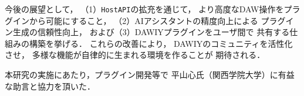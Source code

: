 今後の展望として，
（1）\texttt{HostAPI}の拡充を通じて，
より高度なDAW操作をプラグインから可能にすること，
（2）AIアシスタントの精度向上による
プラグイン生成の信頼性向上，
および（3）DAWIYプラグインをユーザ間で
共有する仕組みの構築を挙げる．
これらの改善により，
DAWIYのコミュニティを活性化させ，
多様な機能が自律的に生まれる環境を作ることが
期待される．

\begin{acknowledgment}
      本研究の実施にあたり，プラグイン開発等で
      平山心氏（関西学院大学）に有益な助言と協力を頂いた．
\end{acknowledgment}